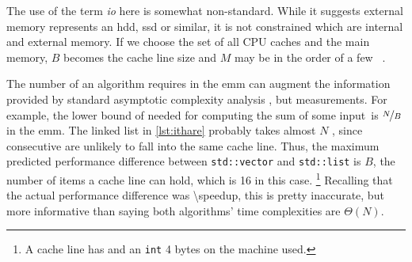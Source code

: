 The use of the term \emph{\acrshort{io}} here is somewhat non-standard.  While it suggests
 external memory represents an \gls{hdd}, \gls{ssd} or similar, it is
not constrained which  are
  internal and external memory.
If we choose the set of all CPU caches and the main memory, \(B\) becomes the cache line
size and \(M\) may be in the order of a few \si{\mebi\byte}.




The number of  an algorithm requires in the \gls{emm} can augment the
information provided by standard asymptotic complexity analysis%
,
but  measurements.
For example, the lower bound of  needed for computing the sum of some
input\ is \(\nicefrac{N}{B}\) in the \gls{emm}.  The
linked list in \cref{lst:ithare} probably takes almost \(N\) , since
consecutive  are unlikely to fall into the same cache line.  Thus,
the maximum predicted performance difference between \texttt{std::vector} and
\texttt{std::list} is \(B\), the number of items a cache line can hold, which is
\si{16} in this case.%
\footnote{%
  A cache line has  and an \texttt{int} \si{4}
  bytes on the machine used.
}
Recalling that the actual performance difference was \num[round-mode=places,
round-precision=0]{\speedup}, this is pretty inaccurate, but more informative than saying
both algorithms' time complexities are  \(\Theta(N)\).

